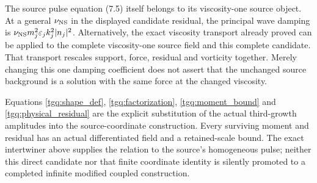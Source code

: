 The source pulse equation (7.5) itself belongs to its viscosity-one
source object. At a general $\nu_{\rm NS}$ in the displayed candidate
residual, the principal wave damping is
$\nu_{\rm NS}m_j^2\varepsilon_jk_j^2|n_j|^2$.
Alternatively, the exact viscosity transport already proved can be
applied to the complete viscosity-one source field and this complete
candidate. That transport rescales support, force, residual and
vorticity together. Merely changing this one damping coefficient
does not assert that the unchanged source background is a solution
with the same force at the changed viscosity.

Equations \eqref{tgq:shape_def}, \eqref{tgq:factorization},
\eqref{tgq:moment_bound} and \eqref{tgq:physical_residual} are the
explicit substitution of the actual third-growth amplitudes into
the source-coordinate construction. Every surviving moment and
residual has an actual differentiated field and a retained-scale
bound. The exact intertwiner above supplies the relation to the
source's homogeneous pulse; neither this direct candidate nor that
finite coordinate identity is silently promoted to a completed
infinite modified coupled construction.
